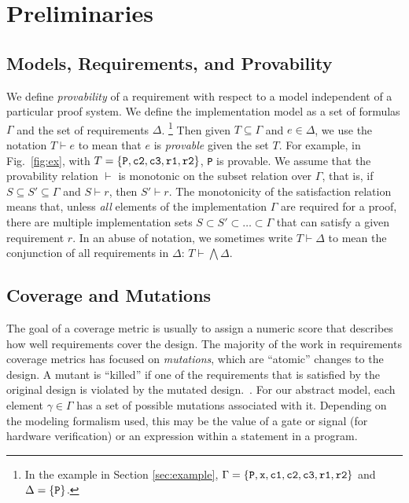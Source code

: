 
\section{Preliminaries}
\label{sec:background}
\newcommand{\satisfies}{\vdash_{\!\!s}}
\newcommand{\nsatisfies}{\nvdash_{\!\!s}}

\subsection{Models, Requirements, and Provability}

We define \emph{provability} of a requirement with respect to a model independent of a particular proof system.  We define the implementation model as a set of formulas $\Gamma$  and the set of requirements $\Delta$.
\footnote{In the example in Section \ref{sec:example}, $\Gamma = \{{\tt P}, {\tt x}, {\tt c1}, {\tt c2}, {\tt c3}, {\tt r1}, {\tt r2}\}$ and $\Delta = \{{\tt P}\}$.}
Then given $T \subseteq \Gamma$ and $e \in \Delta$, we use the notation $T \vdash e$ to mean that $e$ is \emph{provable} given the set $T$. For example, in Fig.~\ref{fig:ex}, with $T = \{{\tt P}, {\tt c2}, {\tt c3}, {\tt r1}, {\tt r2}\}$, {\tt P} is provable. We assume that the provability relation $\vdash$ is monotonic on the subset relation over $\Gamma$, that is, if $S \subseteq S' \subseteq \Gamma$ and $S \vdash r$, then $S' \vdash r$.  The monotonicity of the satisfaction relation means that, unless {\em all} elements of the implementation $\Gamma$ are required for a proof, there are multiple implementation sets $S \subset S' \subset \ldots \subset \Gamma$ that can satisfy a given requirement $r$.  In an abuse of notation, we sometimes write $T \vdash \Delta$ to mean the conjunction of all requirements in $\Delta$: $T \vdash \bigwedge \Delta$.



\subsection{Coverage and Mutations}
The goal of a coverage metric is usually to assign a numeric score that describes how well requirements cover the design.  The majority of the work in requirements coverage metrics has focused on {\em mutations}, which are ``atomic'' changes to the design.  A mutant is ``killed'' if one of the requirements that is satisfied by the original design is violated by the mutated design.~\cite{chockler_coverage_2003,chockler2001practical,chockler2010coverage,Kupferman:2006:SCF,kupferman_theory_2008}.  For our abstract model, each element $\gamma \in \Gamma$ has a set of possible mutations associated with it.  Depending on the modeling formalism used, this may be the value of a gate or signal (for hardware verification) or an expression within a statement in a program.  

